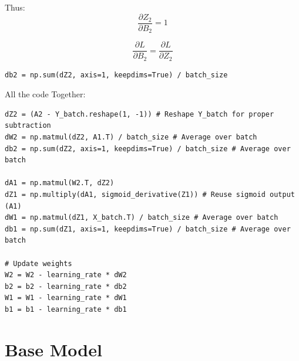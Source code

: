 \documentclass{article}
\begin{document}
Thus:
\begin{equation}
\frac{\partial Z_2}{\partial B_2} = 1
\end{equation}

\begin{equation}
\frac{\partial L}{\partial B_2} = \frac{\partial L}{\partial Z_2}
\end{equation}

\begin{lstlisting}
db2 = np.sum(dZ2, axis=1, keepdims=True) / batch_size
\end{lstlisting}

All the code Together:
\begin{lstlisting}
dZ2 = (A2 - Y_batch.reshape(1, -1)) # Reshape Y_batch for proper subtraction
dW2 = np.matmul(dZ2, A1.T) / batch_size # Average over batch
db2 = np.sum(dZ2, axis=1, keepdims=True) / batch_size # Average over batch

dA1 = np.matmul(W2.T, dZ2)
dZ1 = np.multiply(dA1, sigmoid_derivative(Z1)) # Reuse sigmoid output (A1)
dW1 = np.matmul(dZ1, X_batch.T) / batch_size # Average over batch
db1 = np.sum(dZ1, axis=1, keepdims=True) / batch_size # Average over batch

# Update weights
W2 = W2 - learning_rate * dW2
b2 = b2 - learning_rate * db2
W1 = W1 - learning_rate * dW1
b1 = b1 - learning_rate * db1\end{lstlisting} 

\section{Base Model}
\end{document}
